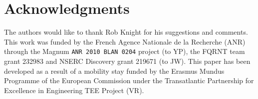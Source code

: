 \section{Acknowledgments}
\label{sec:acknowledgments}
The authors would like to thank Rob Knight for his suggestions and comments.
This work was funded by the French Agence Nationale de la Recherche (ANR) through the {\sc Magnum} {\tt ANR 2010 BLAN 0204} 
project (to YP), the FQRNT team grant 232983 and NSERC Discovery grant 219671 (to JW).
This paper has been developed as a result of a mobility stay funded by the
Erasmus Mundus Programme of the European Commission under
the Transatlantic Partnership for Excellence in Engineering TEE
Project (VR).